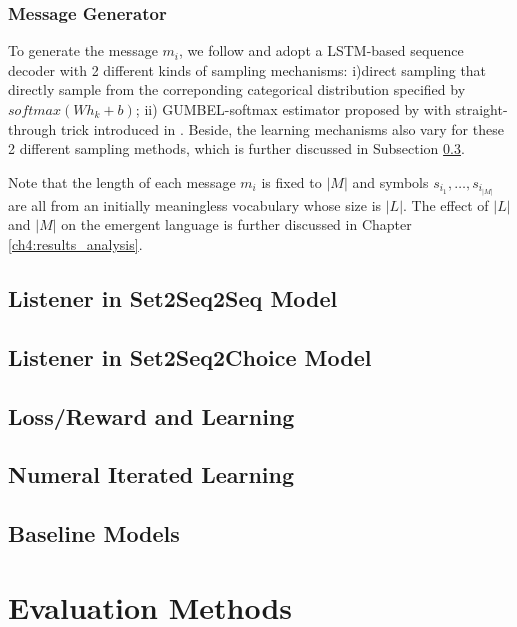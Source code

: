 \subsubsection{Message Generator}
\label{sssec3.2.1.2:msg_generator}

To generate the message $m_i$, we follow \cite{havrylov2017emergence} and adopt a LSTM-based sequence decoder with 2 different kinds of sampling mechanisms: i)direct sampling that directly sample from the correponding categorical distribution specified by $softmax(Wh_k + b)$; ii) GUMBEL-softmax estimator proposed by \cite{jang2016categorical} with straight-through trick introduced in \cite{bengio2013estimating}. Beside, the learning mechanisms also vary for these 2 different sampling methods, which is further discussed in Subsection \ref{ssec3.2.4:loss_learning}.

Note that the length of each message $m_i$ is fixed to $|M|$ and symbols $s_{i_1},\dots,s_{i_|M|}$ are all from an initially meaningless vocabulary whose size is $|L|$. The effect of $|L|$ and $|M|$ on the emergent language is further discussed in Chapter \ref{ch4:results_analysis}.

\subsection{Listener in Set2Seq2Seq Model}
\label{ssec3.2.2:set2seq2seq}

\subsection{Listener in Set2Seq2Choice Model}
\label{ssec3.2.3:set2seq2choice}

\subsection{Loss/Reward and Learning}
\label{ssec3.2.4:loss_learning}

\subsection{Numeral Iterated Learning}
\label{ssec3.2.5:iterated_learning}

\subsection{Baseline Models}
\label{ssec3.2.6:baselines}

\section{Evaluation Methods}
\label{sec3.3:evaluation}
